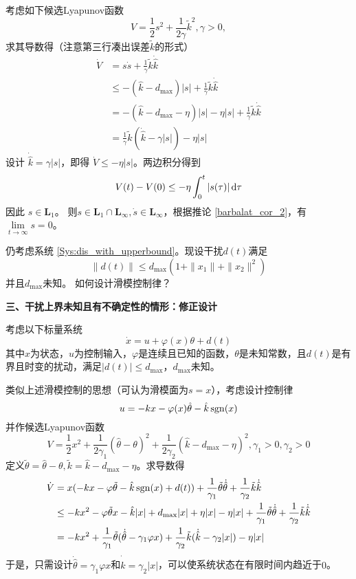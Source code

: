   考虑如下候选Lyapunov函数
  \[ V = \frac{1}{2} s^2 + \frac{1}{2 \gamma} \tilde{k}^2, \gamma > 0, \]
  求其导数得（注意第三行凑出误差$\tilde{k}$的形式）
  \begin{align*}
    \dot{V} & = s  \dot{s} + \frac{1}{\gamma} \tilde{k} \dot{\hat{k}}\\
    & \leq - (\hat{k} - d_{\max}) | s | + \frac{1}{\gamma} \tilde{k}
    \dot{\hat{k}}\\
    & = - (\hat{k} - d_{\max} - \eta) | s | - \eta | s | + \frac{1}{\gamma}
    \tilde{k} \dot{\hat{k}}\\
    & = \frac{1}{\gamma} \tilde{k} (\dot{\hat{k}} - \gamma | s |) - \eta | s |
  \end{align*}
  设计 $\dot{\hat{k}} = \gamma | s |$，即得 $\dot{V} \leq - \eta | s |$。两边积分得到
  \[ V (t) - V (0) \leq - \eta \int^t_0 | s(\tau) | \mathop{}\!\mathrm{d} \tau \]
  因此 $s \in \mathbf{L}_1$。
  则$s \in \mathbf{L}_1 \cap \mathbf{L}_{\infty}, \dot{s} \in
  \mathbf{L}_{\infty}$，根据推论 \ref{barbalat_cor_2}，有 $\lim\limits_{t \rightarrow \infty} s = 0$。
\begin{problem}\label{Pro:dis_with_unknown_upperbound}
    仍考虑系统 \eqref{Sys:dis_with_upperbound}。现设干扰$d(t)$满足
  \[ \| d (t) \| \leq d_{\max} (1 + \| x_1 \| + \| x_2 \|^2) \]
并且$d_{\max}$未知。
如何设计滑模控制律？
\end{problem}

\noindent\textbf{三、干扰上界未知且有不确定性的情形：修正设计}

考虑以下标量系统
\begin{equation}
    \dot{x} = u + \varphi(x)\theta + d(t)
\end{equation}
其中$x$为状态，$u$为控制输入，$\varphi$是连续且已知的函数，$\theta$是未知常数，且$d(t)$是有界且时变的扰动，满足$|d(t)|\le d_{\max}$，$d_{\max}$未知。

类似上述滑模控制的思想（可认为滑模面为$s=x$），考虑设计控制律\[u=-kx-\varphi(x)\hat{\theta}-\hat{k}\operatorname{sgn}(x)\]
并作候选Lyapunov函数\[V=\frac{1}{2}x^2+\frac{1}{2\gamma_1}(\hat{\theta}-\theta)^2+\frac{1}{2\gamma_2}(\hat{k}-d_{\max}-\eta)^2,\gamma_1>0,\gamma_2>0\]
定义$\tilde{\theta}=\hat{\theta}-\theta,\tilde{k}=\hat{k}-d_{\max}-\eta$。求导数得
\begin{align*}
    \dot{V}&=x(-kx-\varphi\tilde{\theta}-\hat{k}\operatorname{sgn}(x)+d(t))+\frac{1}{\gamma_1}\tilde{\theta}\dot{\hat{\theta}}+\frac{1}{\gamma_2}\tilde{k}\dot{\hat{k}}\\
    &\leq -kx^2-\varphi\tilde{\theta}x-\hat{k}|x|+d_{\max}|x|+\eta|x|-\eta|x|+\frac{1}{\gamma_1}\tilde{\theta}\dot{\hat{\theta}}+\frac{1}{\gamma_2}\tilde{k}\dot{\hat{k}}\\
    &=-kx^2+\frac{1}{\gamma_1}\tilde{\theta}(\dot{\hat{\theta}}-\gamma_1\varphi x)+\frac{1}{\gamma_2}\tilde{k}(\dot{\hat{k}}-\gamma_2|x|)-\eta|x|
\end{align*}
于是，只需设计$\dot{\hat{\theta}}=\gamma_1\varphi x$和$\dot{\hat{k}}=\gamma_2|x|$，可以使系统状态在有限时间内趋近于$0$。

